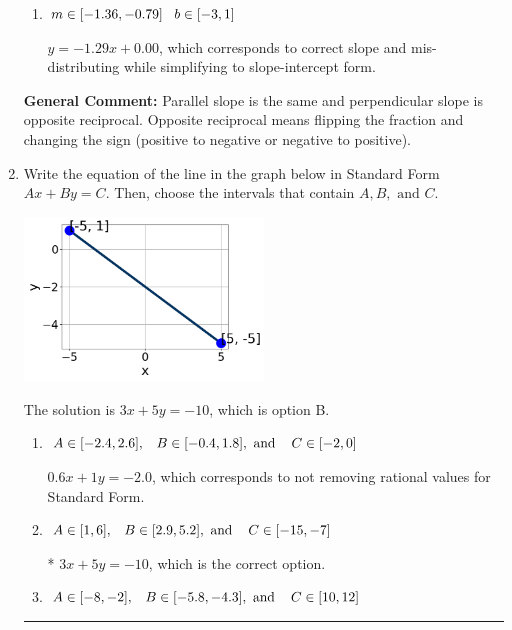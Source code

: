 \documentclass{extbook}[14pt]
\newcommand{\litem}[1]{\item #1

\rule{\textwidth}{0.4pt}}
\begin{document}
\begin{enumerate}
{\begin{enumerate}[label=\Alph*.]
 $y = 1.29x + 1.71$, which corresponds to using the negative slope.
\item \( m \in [-1.36, -0.79] \hspace*{3mm} b \in [-3, 1] \)

 $y = -1.29x + 0.00$, which corresponds to correct slope and mis-distributing while simplifying to slope-intercept form.
\end{enumerate}

\textbf{General Comment:} Parallel slope is the same and perpendicular slope is opposite reciprocal. Opposite reciprocal means flipping the fraction and changing the sign (positive to negative or negative to positive).
}
\litem{
Write the equation of the line in the graph below in Standard Form $Ax+By=C$. Then, choose the intervals that contain $A, B, \text{ and } C$.

\begin{center}
    \includegraphics[width=0.5\textwidth]{../Figures/linearGraphToStandardA.png}
\end{center}


The solution is \( 3x + 5y = -10 \), which is option B.\begin{enumerate}[label=\Alph*.]
\item \( A \in [-2.4, 2.6], \hspace{3mm} B \in [-0.4, 1.8], \text{ and } \hspace{3mm} C \in [-2, 0] \)

 $0.6x + 1y = -2.0$, which corresponds to not removing rational values for Standard Form.
\item \( A \in [1, 6], \hspace{3mm} B \in [2.9, 5.2], \text{ and } \hspace{3mm} C \in [-15, -7] \)

* $3x + 5y = -10$, which is the correct option.
\item \( A \in [-8, -2], \hspace{3mm} B \in [-5.8, -4.3], \text{ and } \hspace{3mm} C \in [10, 12] \)


\end{enumerate}}
\end{enumerate}
\end{document}
